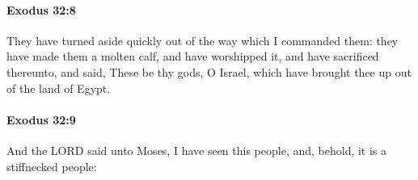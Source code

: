 		\paragraph{Exodus 32:8} %
			\label{EXODUS-32-8}

			They have turned aside quickly out of the way which I commanded them: they have made them a molten calf, and have worshipped it, and have sacrificed thereunto, and said, These be thy gods, O Israel, which have brought thee up out of the land of Egypt.


		\paragraph{Exodus 32:9} %
			\label{EXODUS-32-9}

			And the LORD said unto Moses, I have seen this people, and, behold, it is a stiffnecked people:


